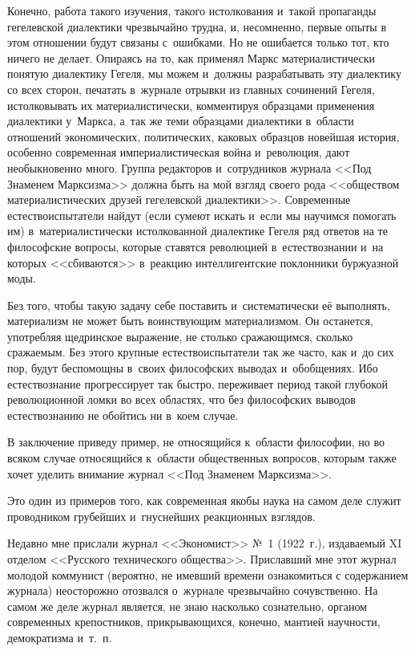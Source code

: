 Конечно, работа такого изучения, такого истолкования и~такой пропаганды
гегелевской диалектики чрезвычайно трудна, и, несомненно, первые опыты в
этом отношении будут связаны с~ошибками. Но не ошибается только тот, кто
ничего не делает. Опираясь на то, как применял Маркс материалистически
понятую диалектику Гегеля, мы можем и~должны разрабатывать эту диалектику
со всех сторон, печатать в~журнале отрывки из главных сочинений Гегеля,
истолковывать их материалистически, комментируя образцами применения
диалектики у~Маркса, а~так же теми образцами диалектики в~области отношений
экономических, политических, каковых образцов новейшая история, особенно
современная империалистическая война и~революция, дают необыкновенно много.
Группа редакторов и~сотрудников журнала <<Под Знаменем Марксизма>> должна
быть на мой взгляд своего рода <<обществом материалистических друзей
гегелевской диалектики>>. Современные естествоиспытатели найдут (если сумеют
искать и~если мы научимся помогать им) в~материалистически истолкованной
диалектике Гегеля ряд ответов на те философские вопросы, которые ставятся
революцией в~естествознании и~на которых <<сбиваются>> в~реакцию
интеллигентские поклонники буржуазной моды.

Без того, чтобы такую задачу себе поставить и~систематически её выполнять,
материализм не может быть воинствующим материализмом. Он останется,
употребляя щедринское выражение, не столько сражающимся, сколько сражаемым.
Без этого крупные естествоиспытатели так же часто, как и~до сих пор, будут
беспомощны в~своих философских выводах и~обобщениях. Ибо естествознание
прогрессирует так быстро, переживает период такой глубокой революционной
ломки во всех областях, что без философских выводов естествознанию не
обойтись ни в~коем случае.

В заключение приведу пример, не относящийся к~области философии, но во
всяком случае относящийся к~области общественных вопросов, которым также
хочет уделить внимание журнал <<Под Знаменем Марксизма>>.

Это один из примеров того, как современная якобы наука на самом деле служит
проводником грубейших и~гнуснейших реакционных взглядов.

Недавно мне прислали журнал <<Экономист>> №~1 (1922~г.),
издаваемый XI отделом <<Русского технического общества>>. Приславший мне этот
журнал молодой коммунист (вероятно, не имевший времени ознакомиться с
содержанием журнала) неосторожно отозвался о~журнале чрезвычайно
сочувственно. На самом же деле журнал является, не знаю насколько
сознательно, органом современных крепостников, прикрывающихся, конечно,
мантией научности, демократизма и~т.~п.

